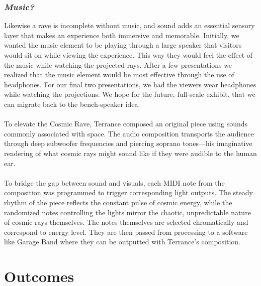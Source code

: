 \documentclass{article}
\begin{document}
 \subsubsection{\textit{Music?}}
 Likewise a rave is incomplete without music, and sound adds an essential sensory layer that makes an experience both immersive and memorable. Initially, we wanted the music element to be playing through a large speaker that visitors would sit on while viewing the experience. This way they would feel the effect of the music while watching the projected rays. After a few presentations we realized that the music element would be most effective through the use of headphones. For our final two presentations, we had the viewers wear headphones while watching the projections. We hope for the future, full-scale exhibit, that we can migrate back to the bench-speaker idea.
 \\\\
 To elevate the Cosmic Rave, Terrance composed an original piece using sounds commonly associated with space. The audio composition transports the audience through deep subwoofer frequencies and piercing soprano tones—his imaginative rendering of what cosmic rays might sound like if they were audible to the human ear.
 \\\\
To bridge the gap between sound and visuals, each MIDI note from the composition was programmed to trigger corresponding light outputs. The steady rhythm of the piece reflects the constant pulse of cosmic energy, while the randomized notes controlling the lights mirror the chaotic, unpredictable nature of cosmic rays themselves. The notes themselves are selected chromatically and correspond to energy level. They are then passed from processing to a software like Garage Band where they can be outputted with Terrance's composition.



\section{Outcomes}
\end{document}
